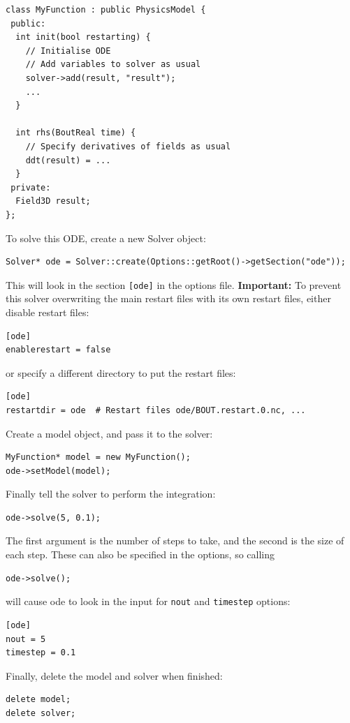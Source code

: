 \documentclass[12pt]{article}
\begin{document}
\begin{lstlisting}
class MyFunction : public PhysicsModel {
 public:
  int init(bool restarting) {
    // Initialise ODE
    // Add variables to solver as usual
    solver->add(result, "result");
    ...
  }

  int rhs(BoutReal time) {
    // Specify derivatives of fields as usual
    ddt(result) = ...
  }
 private:
  Field3D result;
};
\end{lstlisting}

To solve this ODE, create a new Solver object:
\begin{lstlisting}[numbers=none]
Solver* ode = Solver::create(Options::getRoot()->getSection("ode"));
\end{lstlisting}
This will look in the section \texttt{[ode]} in the options file.
{\bf Important:} To prevent this solver overwriting the main restart files
with its own restart files, either disable restart files:
\begin{lstlisting}[numbers=none]
[ode]
enablerestart = false
\end{lstlisting}
or specify a different directory to put the restart files:
\begin{lstlisting}[numbers=none]
[ode]
restartdir = ode  # Restart files ode/BOUT.restart.0.nc, ...
\end{lstlisting}

Create a model object, and pass it to the solver:
\begin{lstlisting}[numbers=none]
MyFunction* model = new MyFunction();
ode->setModel(model);
\end{lstlisting}

Finally tell the solver to perform the integration:
\begin{lstlisting}[numbers=none]
ode->solve(5, 0.1);
\end{lstlisting}
The first argument is the number of steps to take, and the second is the size of each step. These can also be specified in the options, so calling
\begin{lstlisting}[numbers=none]
ode->solve();
\end{lstlisting}
will cause ode to look in the input for \texttt{nout} and \texttt{timestep} options:
\begin{lstlisting}[numbers=none]
[ode]
nout = 5
timestep = 0.1
\end{lstlisting}
Finally, delete the model and solver when finished:
\begin{lstlisting}[numbers=none]
delete model;
delete solver;
\end{lstlisting}
\end{document}
